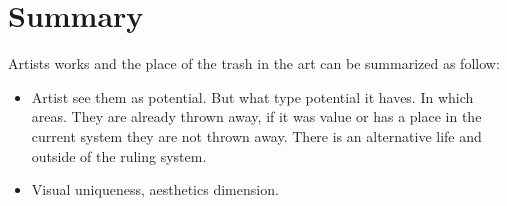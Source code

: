 

\section{Summary}
Artists works and the place of the trash in the art can be summarized as follow:
\begin{itemize}
\item Artist see them as potential. But what type potential it haves. In which areas. They are already thrown away, if it was value or has a place in the current system they are not thrown away. There is an alternative life and outside of the ruling system.
\item Visual uniqueness, aesthetics dimension.
\end{itemize}







